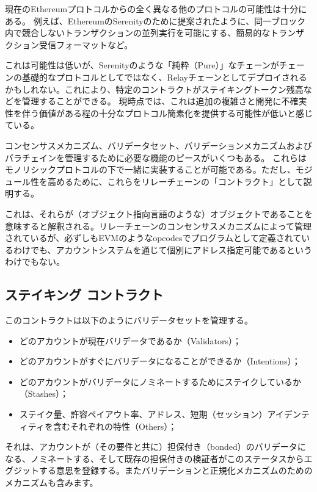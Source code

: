 現在のEthereumプロトコルからの全く異なる他のプロトコルの可能性は十分にある。
例えば、EthereumのSerenityのために提案されたように、同一ブロック内で競合しないトランザクションの並列実行を可能にする、簡易的なトランザクション受信フォーマットなど。

これは可能性は低いが、Serenityのような「純粋（Pure）」なチェーンがチェーンの基礎的なプロトコルとしてではなく、Relayチェーンとしてデプロイされるかもしれない。これにより、特定のコントラクトがステイキングトークン残高などを管理することができる。
現時点では、これは追加の複雑さと開発に不確実性を伴う価値がある程の十分なプロトコル簡素化を提供する可能性が低いと感じている。

コンセンサスメカニズム、バリデータセット、バリデーションメカニズムおよびパラチェインを管理するために必要な機能のピースがいくつもある。
これらはモノリシックプロトコルの下で一緒に実装することが可能である。ただし、モジュール性を高めるために、これらをリレーチェーンの「コントラクト」として説明する。

これは、それらが（オブジェクト指向言語のような）オブジェクトであることを意味すると解釈される。リレーチェーンのコンセンサスメカニズムによって管理されているが、必ずしもEVMのようなopcodesでプログラムとして定義されているわけでも、アカウントシステムを通じて個別にアドレス指定可能であるというわけでもない。

\hypertarget{ux30b9ux30c6ux30a4ux30adux30f3ux30b0-ux30b3ux30f3ux30c8ux30e9ux30afux30c8}{%
\subsection{ステイキング
コントラクト}\label{ux30b9ux30c6ux30a4ux30adux30f3ux30b0-ux30b3ux30f3ux30c8ux30e9ux30afux30c8}}

このコントラクトは以下のようにバリデータセットを管理する。

\begin{itemize}
\tightlist
\item
  どのアカウントが現在バリデータであるか（Validators）；
\item
  どのアカウントがすぐにバリデータになることができるか（Intentions）；
\item
  どのアカウントがバリデータにノミネートするためにステイクしているか（Stashes）；
\item
  ステイク量、許容ペイアウト率、アドレス、短期（セッション）アイデンティティを含むそれぞれの特性（Others）；
\end{itemize}

それは、アカウントが（その要件と共に）担保付き（bonded）のバリデータになる、ノミネートする、そして既存の担保付きの検証者がこのステータスからエグジットする意思を登録する。またバリデーションと正規化メカニズムのためのメカニズムも含みます。

